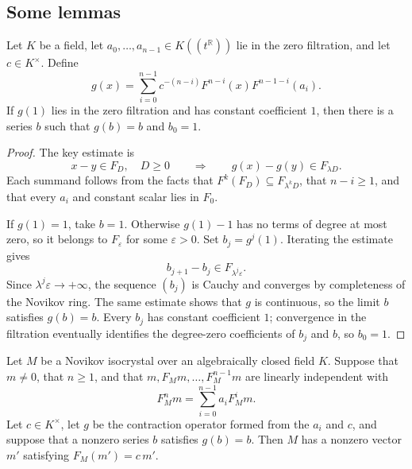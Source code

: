 \subsection{Some lemmas}

\begin{lemma}
  \label{lem:contraction_fixed_point}
  \leanok
  Let $K$ be a field, let $a_0,\ldots,a_{n-1}\in K((t^{\mathbb{R}}))$ lie in
  the zero filtration, and let $c\in K^\times$.  Define
  \[
    g(x)=\sum_{i=0}^{n-1}
      c^{-(n-i)}F^{n-i}(x)F^{n-1-i}(a_i).
  \]
  If $g(1)$ lies in the zero filtration and has constant coefficient $1$, then
  there is a series $b$ such that $g(b)=b$ and $b_0=1$.
\end{lemma}

\begin{proof}
  \leanok
  The key estimate is
  \[
    x-y\in F_D,\quad D\geq0
    \qquad\Longrightarrow\qquad
    g(x)-g(y)\in F_{\lambda D}.
  \]
  Each summand follows from the facts that $F^k(F_D)\subseteq
  F_{\lambda^kD}$, that $n-i\geq1$, and that every $a_i$ and constant scalar
  lies in $F_0$.

  If $g(1)=1$, take $b=1$.  Otherwise $g(1)-1$ has no terms of degree at most
  zero, so it belongs to $F_\varepsilon$ for some $\varepsilon>0$.  Set
  $b_j=g^j(1)$.  Iterating the estimate gives
  \[
    b_{j+1}-b_j\in F_{\lambda^j\varepsilon}.
  \]
  Since $\lambda^j\varepsilon\to+\infty$, the sequence $(b_j)$ is Cauchy and
  converges by completeness of the Novikov ring.  The same estimate shows
  that $g$ is continuous, so the limit $b$ satisfies $g(b)=b$.  Every $b_j$
  has constant coefficient $1$; convergence in the filtration eventually
  identifies the degree-zero coefficients of $b_j$ and $b$, so $b_0=1$.
\end{proof}

\begin{lemma}
  \label{lem:fixed_point_gives_frobenius_eigenvector}
  \leanok
  Let $M$ be a Novikov isocrystal over an algebraically closed field $K$.
  Suppose that $m\ne0$, that $n\geq1$, and that
  $m,F_Mm,\ldots,F_M^{n-1}m$ are linearly independent with
  \[
    F_M^nm=\sum_{i=0}^{n-1}a_iF_M^im.
  \]
  Let $c\in K^\times$, let $g$ be the contraction operator formed from the
  $a_i$ and $c$, and suppose that a nonzero series $b$ satisfies $g(b)=b$.
  Then $M$ has a nonzero vector $m'$ satisfying $F_M(m')=c\,m'$.
\end{lemma}

